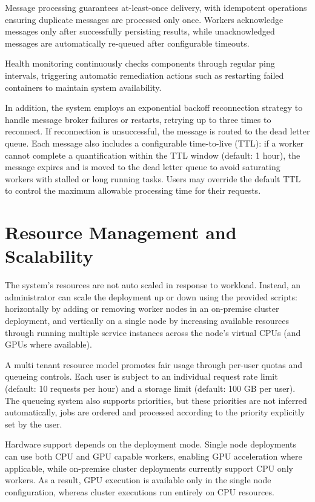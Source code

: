 Message processing guarantees at-least-once delivery, with idempotent operations ensuring duplicate messages are processed only once. Workers acknowledge messages only after successfully persisting results, while unacknowledged messages are automatically re-queued after configurable timeouts.

Health monitoring continuously checks components through regular ping intervals, triggering automatic remediation actions such as restarting failed containers to maintain system availability.

In addition, the system employs an exponential backoff reconnection strategy to handle message broker failures or restarts, retrying up to three times to reconnect. If reconnection is unsuccessful, the message is routed to the dead letter queue. Each message also includes a configurable time-to-live (TTL): if a worker cannot complete a quantification within the TTL window (default: 1 hour), the message expires and is moved to the dead letter queue to avoid saturating workers with stalled or long running tasks. Users may override the default TTL to control the maximum allowable processing time for their requests.

\section{Resource Management and Scalability}
The system’s resources are not auto scaled in response to workload. Instead, an administrator can scale the deployment up or down using the provided scripts: horizontally by adding or removing worker nodes in an on-premise cluster deployment, and vertically on a single node by increasing available resources through running multiple service instances across the node’s virtual CPUs (and GPUs where available).

A multi tenant resource model promotes fair usage through per-user quotas and queueing controls. Each user is subject to an individual request rate limit (default: 10 requests per hour) and a storage limit (default: 100 GB per user). The queueing system also supports priorities, but these priorities are not inferred automatically, jobs are ordered and processed according to the priority explicitly set by the user.

Hardware support depends on the deployment mode. Single node deployments can use both CPU and GPU capable workers, enabling GPU acceleration where applicable, while on-premise cluster deployments currently support CPU only workers. As a result, GPU execution is available only in the single node configuration, whereas cluster executions run entirely on CPU resources.

